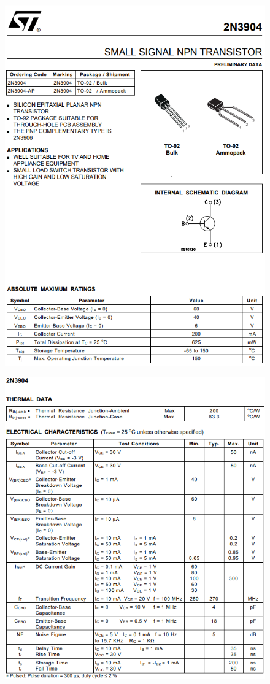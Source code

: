 \begin{figure}[h]
    \centering
    \includegraphics[width=0.9\linewidth]{Appendices/2N3904_1.png}
    \label{2N3904_1}
\end{figure}
\begin{figure}[h]
    \centering
    \includegraphics[width=0.9\linewidth]{Appendices/2N3904_2.png}
    \label{2N3904_2}
\end{figure}
\FloatBarrier

